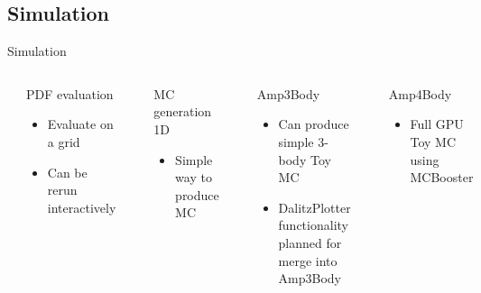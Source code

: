 \documentclass[aspectratio=169, smaller]{beamer}
\begin{document}
\subsection{Simulation}
\begin{frame}[fragile]{Simulation}
    \begin{columns}[c]
        \begin{lstlisting}[language=Python]
grid, pts = gauss.evaluatePdf(x)
gauss.setData(grid)
        \end{lstlisting}
        \begin{block}{PDF evaluation}
            \begin{itemize}
                \item Evaluate on a grid
                \item Can be rerun interactively
            \end{itemize}
        \end{block}

        \begin{lstlisting}[language=Python]
gauss.fillMCDataSimple(1000000)
        \end{lstlisting}
        \begin{block}{MC generation 1D}
            \begin{itemize}
                \item Simple way to produce MC
            \end{itemize}
        \end{block}
        \begin{lstlisting}[language=Python]
dplt = DalitzPlotter(prod, dp)
arr = dplt.make2D()        
        \end{lstlisting}
        \begin{block}{Amp3Body}
            \begin{itemize}
                \item Can produce simple 3-body Toy MC
                \item DalitzPlotter functionality planned for merge into Amp3Body
            \end{itemize}
        \end{block}

        \begin{lstlisting}[language=Python]
aa.setGenerationOffset(0);
aa.GenerateSig(1000000);
        \end{lstlisting}
        \begin{block}{Amp4Body}
            \begin{itemize}
                \item Full GPU Toy MC using MCBooster
            \end{itemize}
        \end{block}

    \end{columns}
\end{frame}
\end{document}
